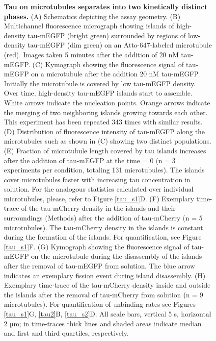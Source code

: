 \begin{figure}[h!]
{\textbf{Tau on microtubules separates into two kinetically distinct phases.} (A) Schematics depicting the assay geometry. (B) Multichannel fluorescence micrograph showing islands of high-density tau-mEGFP (bright green) surrounded by regions of low-density tau-mEGFP (dim green) on an Atto-647-labeled microtubule (red). Images taken 5 minutes after the addition of 20 nM tau-mEGFP. (C) Kymograph showing the fluorescence signal of tau-mEGFP on a microtubule after the addition 20 nM tau-mEGFP. Initially the microtubule is covered by low tau-mEGFP density. Over time, high-density tau-mEGFP islands start to assemble. White arrows indicate the nucleation points. Orange arrows indicate the merging of two neighboring islands growing towards each other. This experiment has been repeated 343 times with similar results. (D) Distribution of fluorescence intensity of tau-mEGFP along the microtubules such as shown in (C) showing two distinct populations. (E) Fraction of microtubule length covered by tau islands increases after the addition of tau-mEGFP at the time = 0 (n = 3 experiments per condition, totaling 131 microtubules). The islands cover microtubules faster with increasing tau concentration in solution. For the analogous statistics calculated over individual microtubules, please, refer to Figure \ref{tau_s1}D. (F) Exemplary time-trace of the tau-mCherry density in the islands and their surroundings (Methods) after the addition of tau-mCherry (n = 5 microtubules). The tau-mCherry density in the islands is constant during the formation of the islands. For quantification, see Figure \ref{tau_s1}F. (G) Kymograph showing the fluorescence signal of tau-mEGFP on the microtubule during the disassembly of the islands after the removal of tau-mEGFP from solution. The blue arrow indicates an exemplary fission event during island disassembly. (H) Exemplary time-trace of the tau-mCherry density inside and outside the islands after the removal of tau-mCherry from solution (n = 9 microtubules). For quantification of unbinding rates see Figures \ref{tau_s1}G, \ref{tau2}B, \ref{tau_s2}D. All scale bars, vertical 5 s, horizontal 2 µm; in time-traces thick lines and shaded areas indicate median and first and third quartiles, respectively. 
	}\label{tau1}
\end{figure}
